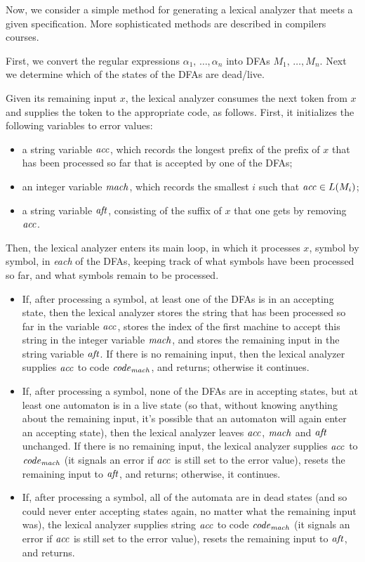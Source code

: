 Now, we consider a simple method for generating a lexical analyzer
that meets a given specification.  More sophisticated methods are
described in compilers courses.

First, we convert the regular expressions $\alpha_1,\,\ldots,\alpha_n$
into DFAs $M_1,\,\ldots,M_n$.  Next we determine which of the states
of the DFAs are dead/live.

Given its remaining input $x$, the lexical analyzer consumes the next
token from $x$ and supplies the token to the appropriate code, as
follows.  First, it initializes the following variables to error
values:
\begin{itemize}
\item a string variable $\mathit{acc}$, which records the longest prefix of
  the prefix of $x$ that has been processed so far that is accepted by
  one of the DFAs;

\item an integer variable $\mathit{mach}$, which records the smallest $i$ such
  that $\mathit{acc}\in L(M_i)$;

\item a string variable $\mathit{aft}$, consisting of the suffix of $x$ that
  one gets by removing $\mathit{acc}$.
\end{itemize}

Then, the lexical analyzer enters its main loop, in which it processes
$x$, symbol by symbol, in \emph{each} of the DFAs, keeping track of
what symbols have been processed so far, and what symbols remain to be
processed.
\begin{itemize}
\item If, after processing a symbol, at least one of the DFAs is in an
  accepting state, then the lexical analyzer stores the string that
  has been processed so far in the variable $\mathit{acc}$, stores the index
  of the first machine to accept this string in the integer variable
  $\mathit{mach}$, and stores the remaining input in the string variable
  $\mathit{aft}$.  If there is no remaining input, then the lexical analyzer
  supplies $\mathit{acc}$ to code ${\it code}_{\mathit{mach}}$, and returns; otherwise it
  continues.

\item If, after processing a symbol, none of the DFAs are in accepting
  states, but at least one automaton is in a live state (so that,
  without knowing anything about the remaining input, it's possible
  that an automaton will again enter an accepting state), then the
  lexical analyzer leaves $\mathit{acc}$, $\mathit{mach}$ and $\mathit{aft}$ unchanged.  If
  there is no remaining input, the lexical analyzer supplies $\mathit{acc}$ to
  ${\it code}_{\mathit{mach}}$ (it signals an error if $\mathit{acc}$ is still set to the
  error value), resets the remaining input to $\mathit{aft}$, and returns;
  otherwise, it continues.

\item If, after processing a symbol, all of the automata are in dead
  states (and so could never enter accepting states again, no matter
  what the remaining input was), the lexical analyzer supplies string
  $\mathit{acc}$ to code ${\it code}_{\mathit{mach}}$ (it signals an error if $\mathit{acc}$ is still
  set to the error value), resets the remaining input to $\mathit{aft}$, and
  returns.
\end{itemize}


